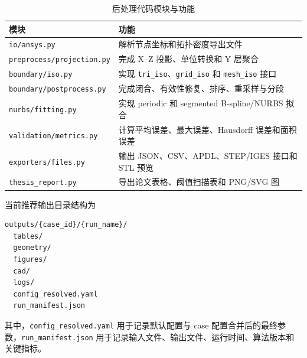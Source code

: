 \documentclass{FRB-style}
\newcommand{\codepath}[1]{\texttt{#1}}
\begin{document}
\begin{table}[H]
\centering
\caption{后处理代码模块与功能}
\begin{tabularx}{\textwidth}{p{}X}
\toprule
模块 & 功能 \\
\midrule
\codepath{io/ansys.py} & 解析节点坐标和拓扑密度导出文件 \\
\codepath{preprocess/projection.py} & 完成 X--Z 投影、单位转换和 Y 层聚合 \\
\codepath{boundary/iso.py} & 实现 \codepath{tri\_iso}、\codepath{grid\_iso} 和 \codepath{mesh\_iso} 接口 \\
\codepath{boundary/postprocess.py} & 完成闭合、有效性修复、排序、重采样与分段 \\
\codepath{nurbs/fitting.py} & 实现 periodic 和 segmented B-spline/NURBS 拟合 \\
\codepath{validation/metrics.py} & 计算平均误差、最大误差、Hausdorff 误差和面积误差 \\
\codepath{exporters/files.py} & 输出 JSON、CSV、APDL、STEP/IGES 接口和 STL 预览 \\
\codepath{thesis\_report.py} & 导出论文表格、阈值扫描表和 PNG/SVG 图 \\
\bottomrule
\end{tabularx}
\end{table}

当前推荐输出目录结构为
\begin{verbatim}
outputs/{case_id}/{run_name}/
  tables/
  geometry/
  figures/
  cad/
  logs/
  config_resolved.yaml
  run_manifest.json
\end{verbatim}
其中，\codepath{config\_resolved.yaml} 用于记录默认配置与 case 配置合并后的最终参数，\codepath{run\_manifest.json} 用于记录输入文件、输出文件、运行时间、算法版本和关键指标。
\end{document}
